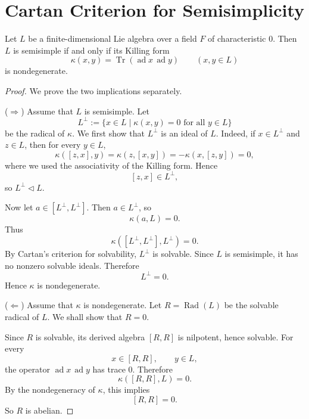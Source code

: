 \section{Cartan Criterion for Semisimplicity}

\begin{theorem}
    Let $L$ be a finite-dimensional Lie algebra over a field $F$ of characteristic $0$.
    Then $L$ is semisimple if and only if its Killing form
    \[
        \kappa(x,y)=\operatorname{Tr}(\operatorname{ad}x\,\operatorname{ad}y)
        \qquad (x,y\in L)
    \]
    is nondegenerate.
\end{theorem}

\begin{proof}
    We prove the two implications separately.

    \smallskip

    \noindent
    ($\Rightarrow$) Assume that $L$ is semisimple. Let
    \[
        L^\perp:=\{x\in L\mid \kappa(x,y)=0 \text{ for all } y\in L\}
    \]
    be the radical of $\kappa$. We first show that $L^\perp$ is an ideal of $L$.
    Indeed, if $x\in L^\perp$ and $z\in L$, then for every $y\in L$,
    \[
        \kappa([z,x],y)=\kappa(z,[x,y])=-\kappa(x,[z,y])=0,
    \]
    where we used the associativity of the Killing form. Hence
    \[
        [z,x]\in L^\perp,
    \]
    so $L^\perp\triangleleft L$.

    Now let $a\in [L^\perp,L^\perp]$. Then $a\in L^\perp$, so
    \[
        \kappa(a,L)=0.
    \]
    Thus
    \[
        \kappa([L^\perp,L^\perp],L^\perp)=0.
    \]
    By Cartan's criterion for solvability, $L^\perp$ is solvable. Since $L$ is semisimple, it has no nonzero solvable ideals. Therefore
    \[
        L^\perp=0.
    \]
    Hence $\kappa$ is nondegenerate.

    \smallskip

    \noindent
    ($\Leftarrow$) Assume that $\kappa$ is nondegenerate. Let $R=\operatorname{Rad}(L)$ be the solvable radical of $L$. We shall show that $R=0$.

    Since $R$ is solvable, its derived algebra $[R,R]$ is nilpotent, hence solvable. For every
    \[
        x\in [R,R], \qquad y\in L,
    \]
    the operator $\operatorname{ad}x\,\operatorname{ad}y$ has trace $0$. Therefore
    \[
        \kappa([R,R],L)=0.
    \]
    By the nondegeneracy of $\kappa$, this implies
    \[
        [R,R]=0.
    \]
    So $R$ is abelian.


\end{proof}
